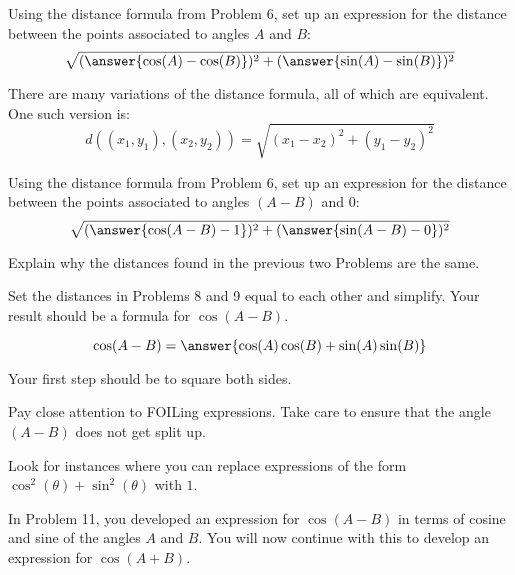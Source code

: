 \documentclass[number]{ximera}
\begin{document}
\begin{problem}
Using the distance formula from Problem 6, set up an expression for the distance between the points associated to angles $A$ and $B$:
\[\sqrt{(\answer{\cos(A)-\cos(B)})^2+(\answer{\sin(A)-\sin(B)})^2}\]
\begin{hint}
There are many variations of the distance formula, all of which are equivalent. One such version is:
\[d((x_1,y_1),(x_2,y_2))=\sqrt{(x_1-x_2)^2+(y_1-y_2)^2}\]
\end{hint}
\end{problem}

\begin{problem}
Using the distance formula from Problem 6, set up an expression for the distance between the points associated to angles $(A-B)$ and $0$:
\[\sqrt{(\answer{\cos(A-B)-1})^2+(\answer{\sin(A-B)-0})^2}\]

\end{problem}

\begin{question}
Explain why the distances found in the previous two Problems are the same.
\begin{freeResponse}

\end{freeResponse}

\end{question}

\begin{problem}
Set the distances in Problems 8 and 9 equal to each other and simplify.
Your result should be a formula for $\cos(A-B)$.

\[\cos(A-B)=\answer{\cos(A)\cos(B)+\sin(A)\sin(B)}\]

\begin{hint}
Your first step should be to square both sides.
\end{hint}
\begin{hint}
Pay close attention to FOILing expressions. Take care to ensure that the angle $(A-B)$ does not get split up.
\end{hint}
\begin{hint}
Look for instances where you can replace expressions of the form $\cos^2(\theta)+\sin^2(\theta)$ with $1$.
\end{hint}
\end{problem}

In Problem 11, you developed an expression for $\cos(A-B)$ in terms of cosine and sine of the angles $A$ and $B$. You will now continue with this to develop an expression for $\cos(A+B)$.
\end{document}
